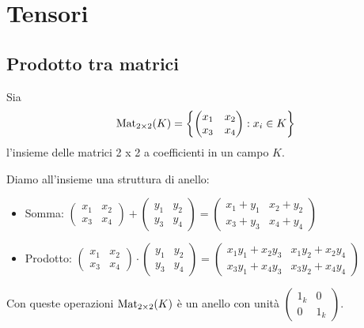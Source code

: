\documentclass[../main.tex]{subfiles}
\begin{document}
\chapter{Tensori}
\section{Prodotto tra matrici}
\begin{definition}
    Sia
    \begin{equation*}
        \operatorname{Mat}_{2 \times 2}(K) = \left\{\begin{pmatrix} x_1 & x_2 \\ x_3 & x_4 \end{pmatrix} : x_i \in K \right\}
    \end{equation*}
    l'insieme delle matrici 2 x 2 a coefficienti in un campo $K$.
\end{definition}
Diamo all'insieme una struttura di anello:
\begin{itemize}
    \item Somma: $\begin{pmatrix} x_1 & x_2 \\ x_3 & x_4 \end{pmatrix} + \begin{pmatrix} y_1 & y_2 \\ y_3 & y_4 \end{pmatrix} = \begin{pmatrix} x_1 + y_1 & x_2 + y_2 \\ x_3 + y_3 & x_4 + y_4 \end{pmatrix}$
    \item Prodotto: $\begin{pmatrix} x_1 & x_2 \\ x_3 & x_4 \end{pmatrix} \cdot \begin{pmatrix} y_1 & y_2 \\ y_3 & y_4 \end{pmatrix} = \begin{pmatrix} x_1 y_1 + x_2 y_3 & x_1 y_2 + x_2 y_4 \\ x_3 y_1 + x_4 y_3 & x_3 y_2 + x_4 y_4 \end{pmatrix}$
\end{itemize}
Con queste operazioni $\operatorname{Mat}_{2 \times 2}(K)$ è un anello con unità
$\begin{pmatrix} 1_k & 0 \\ 0 & 1_k \end{pmatrix}$.
\end{document}
